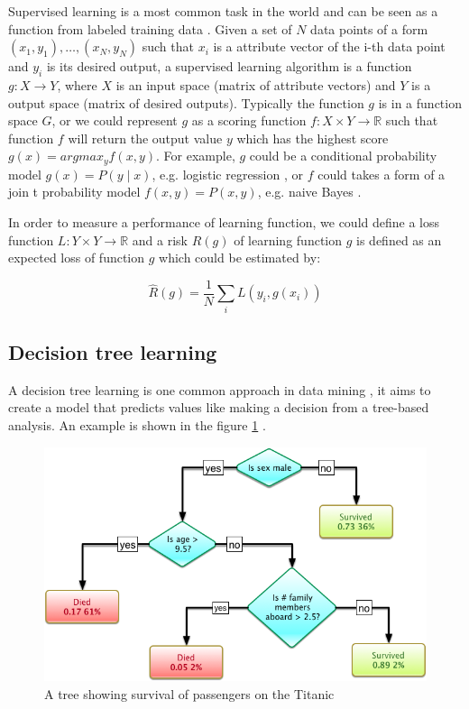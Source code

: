 Supervised learning is a most common task in the world and can be seen as a function from labeled training data \citep{mohri2012foundations}. Given a set of $N$ data points of a form ${(x_1, y_1), \dots, (x_N, y_N)}$ such that $x_i$ is a attribute vector of the i-th data point and $y_i$ is its desired output, a supervised learning algorithm is a function $g: X \rightarrow Y$, where $X$ is an input space (matrix of attribute vectors) and $Y$ is a output space (matrix of desired outputs). Typically the function $g$ is in a function space $G$, or we could represent $g$ as a scoring function $f: X \times Y \rightarrow \mathbb{R}$ such that function $f$ will return the output value $y$ which has the highest score $g(x) = argmax_y f(x, y)$. For example, $g$ could be a conditional probability model $g(x) = P(y \mid x)$, e.g. logistic regression \citep{walker1967estimation, cox1958regression}, or $f$ could takes a form of a join t probability model $f(x, y) = P(x, y)$, e.g. naive Bayes \citep{russell1995modern}.

In order to measure a performance of learning function, we could define a loss function $L: Y \times Y \rightarrow \mathbb{R}$ and a risk $R(g)$ of learning function $g$ is defined as an expected loss of function $g$ which could be estimated by:

\begin{equation}
\widehat{R} (g) = \dfrac{1}{N} \sum_i L(y_i, g(x_i))
\end{equation}

\subsection*{Decision tree learning}

A decision tree learning is one common approach in data mining \citep{rokach2014data}, it aims to create a model that predicts values like making a decision from a tree-based analysis. An example is shown in the figure \ref{img:titanic_survival_decision_tree} \citep{decision_tree_learning}.

\begin{figure}
\includegraphics[scale=0.4]{Images/Titanic_Survival_Decison_Tree_SVG.png}
\centering
\caption{A tree showing survival of passengers on the Titanic}
\label{img:titanic_survival_decision_tree}
\end{figure}

